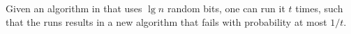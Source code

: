     \begin{lemma}
        Given an algorithm \Alg in  that uses $\lg n$
        random bits, one can run it $t$ times, such that the runs
        results in a new algorithm that fails with probability at most
        $1/t$.
    \end{lemma}
